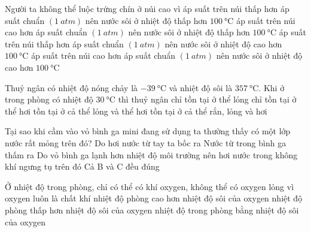 \begin{ex}
Người ta không thể luộc trứng chín ở núi cao vì
\choice
{\True áp suất trên núi thấp hơn áp suất chuẩn $\left(\SI{1}{atm}\right)$ nên nước sôi ở nhiệt độ thấp hơn $\SI{100}{\celsius}$}
{ áp suất trên núi cao hơn áp suất chuẩn $\left(\SI{1}{atm}\right)$ nên nước sôi ở nhiệt độ thấp hơn $\SI{100}{\celsius}$}
{ áp suất trên núi thấp hơn áp suất chuẩn $\left(\SI{1}{atm}\right)$ nên nước sôi ở nhiệt độ cao hơn $\SI{100}{\celsius}$}
{ áp suất trên núi cao hơn áp suất chuẩn $\left(\SI{1}{atm}\right)$ nên nước sôi ở nhiệt độ cao hơn $\SI{100}{\celsius}$}
\loigiai{ }
\end{ex}
\begin{ex}
Thuỷ ngân có nhiệt độ nóng chảy là $\SI{-39}{\celsius}$ và nhiệt độ sôi là $\SI{357}{\celsius}$. Khi ở trong phòng có nhiệt độ $\SI{30}{\celsius}$ thì thuỷ ngân
\choice
{chỉ tồn tại ở thể lỏng}
{ chỉ tồn tại ở thể hơi}
{\True  tồn tại ở cả thể lỏng và thể hơi}
{ tồn tại ở cả thể rắn, lỏng và hơi}
\loigiai{ }
\end{ex}
\begin{ex}
Tại sao khi cầm vào vỏ bình ga mini đang sử dụng ta thường thấy có một lớp nước rất
mỏng trên đó?
\choice
{ Do hơi nước từ tay ta bốc ra}
{ Nước từ trong bình ga thấm ra}
{\True Do vỏ bình ga lạnh hơn nhiệt độ môi trường nên hơi nước trong không khí ngưng tụ trên đó}
{ Cả B và C đều đúng}
\loigiai{ }
\end{ex}
\begin{ex}
Ở nhiệt độ trong phòng, chỉ có thể có khí oxygen, không thể có oxygen lỏng vì
\choice
{ oxygen luôn là chất khí}
{\True nhiệt độ phòng cao hơn nhiệt độ sôi của oxygen}
{ nhiệt độ phòng thấp hơn nhiệt độ sôi của oxygen}
{ nhiệt độ trong phòng bằng nhiệt độ sôi của oxygen}
\loigiai{ }
\end{ex}


